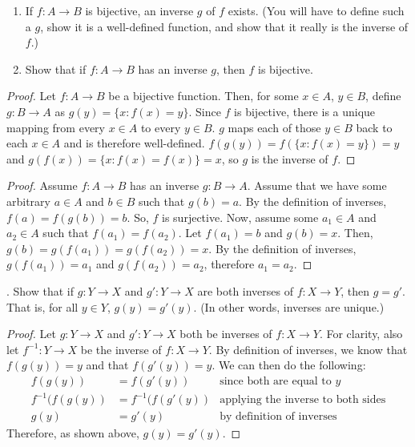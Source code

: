 \documentclass[11pt]{article}
\begin{document}
\begin{enumerate}
\renewcommand{\labelenumi}{\alph{enumi}.}
\item If $f:A \to B$ is bijective, an inverse $g$ of $f$ exists. (You will have to define such a $g$, show it is a well-defined function, and show that it really is the inverse of $f$.)
\item Show that if $f:A \to B$ has an inverse $g$, then $f$ is bijective.
\end{enumerate}

\color{RoyalBlue}
\begin{proof}
Let $f: A \to B$ be a bijective function. Then, for some $x \in A$, $y \in B$, define $g: B \to A$ as $g(y) = \{x: f(x) = y\}$. Since $f$ is bijective, there is a unique mapping from every $x \in A$ to every $y \in B$. $g$ maps each of those $y \in B$ back to each $x \in A$ and is therefore well-defined. $f(g(y)) = f(\{x: f(x) = y\}) = y$ and $g(f(x)) = \{x: f(x) = f(x)\} = x$, so $g$ is the inverse of $f$.
\end{proof}

\begin{proof}
Assume $f: A \to B$ has an inverse $g: B \to A$. Assume that we have some arbitrary $a \in A$ and $b \in B$ such that $g(b) = a$. By the definition of inverses, $f(a) = f(g(b)) = b$. So, $f$ is surjective. Now, assume some $a_1 \in A$ and $a_2 \in A$ such that $f(a_1) = f(a_2)$. Let $f(a_1) = b$ and $g(b) = x$. Then, $g(b) = g(f(a_1)) = g(f(a_2)) = x$. By the definition of inverses, $g(f(a_1)) = a_1$ and $g(f(a_2)) = a_2$, therefore $a_1 = a_2$.
\end{proof}
\color{black}


\newpage
{}. Show that if $g: Y \to X$ and $g' : Y \to X$ are both inverses of $f: X \to Y$, then $g = g'$. That is, for all $y \in Y$, $g(y) = g'(y)$. (In other words, inverses are unique.)

\color{RoyalBlue}
\begin{proof}
Let $g: Y \to X$ and $g': Y \to X$ both be inverses of $f: X \to Y$. For clarity, also let $f^{-1}: Y \to X$ be the inverse of $f: X \to Y$. By definition of inverses, we know that $f(g(y)) = y$ and that $f(g'(y)) = y$. We can then do the following:
\begin{align*}
    f(g(y)) & = f(g'(y)) & \text{since both are equal to $y$}\\
    f^{-1}(f(g(y)) & = f^{-1}(f(g'(y)) & \text{applying the inverse to both sides}\\
    g(y) & = g'(y) & \text{by definition of inverses}
\end{align*}
Therefore, as shown above, $g(y) = g'(y)$.
\end{proof}
\color{black}
\end{document}
